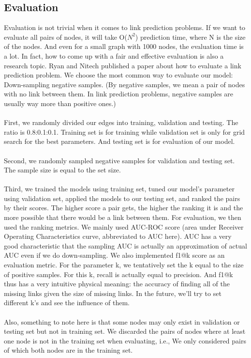 \documentclass[12pt]{article}
\begin{document}
\subsection{Evaluation}
Evaluation is not trivial when it comes to link prediction problems. If we want to evaluate all pairs of nodes, it will take O($N^2$) prediction time, where N is the size of the nodes. And even for a small graph with 1000 nodes, the evaluation time is a lot. In fact, how to come up with a fair and effective evaluation is also a research topic. Ryan and Nitech published a paper about how to evaluate a link prediction problem. We choose the most common way to evaluate our model: Down-sampling negative samples. (By negative samples, we mean a pair of nodes with no link between them. In link prediction problems, negative samples are usually way more than positive ones.)
\\
\\
First, we randomly divided our edges into training, validation and testing. The ratio is 0.8:0.1:0.1. Training set is for training while validation set is only for grid search for the best parameters. And testing set is for evaluation of our model. 
\\
\\
Second, we randomly sampled negative samples for validation and testing set. The sample size is equal to the set size.
\\
\\
Third, we trained the models using training set, tuned our model's parameter using validation set, applied the models to our testing set, and ranked the pairs by their scores. The higher score a pair gets, the higher the ranking it is and the more possible that there would be a link between them. For evaluation, we then used the ranking metrics. We mainly used AUC-ROC score (area under Receiver Operating Characteristics curve, abbreviated to AUC here). AUC has a very good characteristic that the sampling AUC is actually an approximation of actual AUC even if we do down-sampling. We also implemented f1@k score as an evaluation metric. For the parameter k, we tentatively set the k equal to the size of positive samples. For this k, recall is actually equal to precision. And f1@k thus has a very intuitive physical meaning: the accuracy of finding all of the missing links given the size of missing links. In the future, we'll try to set different k's and see the influence of them. 
\\
\\
Also, something to note here is that some nodes may only exist in validation or testing set but not in training set. We discarded the pairs of nodes where at least one node is not in the training set when evaluating, i.e., We only considered pairs of which both nodes are in the training set.
\end{document}

